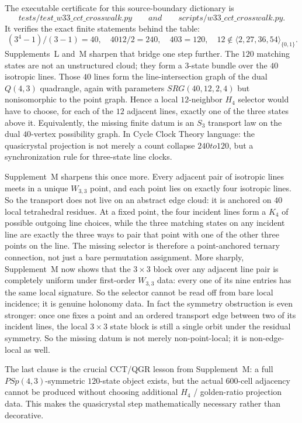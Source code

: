\documentclass[12pt,a4paper]{article}
\def\mathrm#1{#1}%
\def\texttt#1{#1}%
\def\text#1{#1}%
\def\cdot{ }%
\def\to{ to }%
\theoremstyle{definition}
\newcommand{\SRG}{\mathrm{SRG}}
\newcommand{\PSp}{\mathrm{PSp}}
\begin{document}
The executable certificate for this source-boundary dictionary is
\[
\texttt{tests/test\_w33\_cct\_crosswalk.py}
\qquad\text{and}\qquad
\texttt{scripts/w33\_cct\_crosswalk.py}.
\]
It verifies the exact finite statements behind the table:
\[
\boxed{\;
(3^4-1)/(3-1)=40,\quad
40\cdot 12/2=240,\quad
40\cdot 3=120,\quad
12\notin\langle 2,27,36,54\rangle_{\{0,1\}}.
\;}
\]
Supplements~L and~M sharpen that bridge one step further.  The $120$
matching states are not an unstructured cloud; they form a $3$-state
bundle over the $40$ isotropic lines.  Those $40$ lines form the
line-intersection graph of the dual $Q(4,3)$ quadrangle, again with
parameters $\SRG(40,12,2,4)$ but nonisomorphic to the point graph.
Hence a local $12$-neighbor $H_4$ selector would
have to choose, for each of the $12$ adjacent lines, exactly one of the
three states above it.  Equivalently, the missing finite datum is an
$S_3$ transport law on the dual $40$-vertex possibility graph.  In
Cycle Clock Theory language: the quasicrystal projection is not merely a
count collapse $240\to 120$, but a synchronization rule for three-state
line clocks.

Supplement~M sharpens this once more.  Every adjacent pair of isotropic
lines meets in a unique $W_{3,3}$ point, and each point lies on exactly
four isotropic lines.  So the transport does not live on an abstract
edge cloud: it is anchored on $40$ local tetrahedral residues.  At a
fixed point, the four incident lines form a $K_4$ of possible outgoing
line choices, while the three matching states on any incident line are
exactly the three ways to pair that point with one of the other three
points on the line.  The missing selector is therefore a point-anchored
ternary connection, not just a bare permutation assignment.  More
sharply, Supplement~M now shows that the $3\times 3$ block over any
adjacent line pair is completely uniform under first-order $W_{3,3}$
data: every one of its nine entries has the same local signature.  So
the selector cannot be read off from bare local incidence; it is genuine
holonomy data.  In fact the symmetry obstruction is even stronger: once
one fixes a point and an ordered transport edge between two of its
incident lines, the local $3\times 3$ state block is still a single
orbit under the residual symmetry.  So the missing datum is not merely
non-point-local; it is non-edge-local as well.

The last clause is the crucial CCT/QGR lesson from Supplement~M: a
full $\PSp(4,3)$-symmetric $120$-state object exists, but the actual
$600$-cell adjacency cannot be produced without choosing additional
$H_4$ / golden-ratio projection data.  This makes the quasicrystal step
mathematically necessary rather than decorative.
\end{document}

